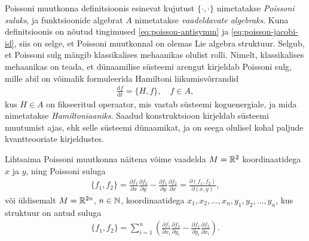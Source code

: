 Poissoni muutkonna definitsioonis esinevat kujutust $\{\cdot, \cdot\}$
nimetatakse \emph{Poissoni suluks}, ja funktsioonide algebrat $A$ nimetatakse
\emph{vaadeldavate algebraks}. Kuna definitsioonis on nõutud tingimused
\eqref{eq:poisson-antisymm} ja \eqref{eq:poisson-jacobi-id}, siis on selge,
et Poissoni muutkonnal on olemas Lie algebra struktuur.
Selgub, et Poissoni sulg mängib klassikalises mehaanikas olulist rolli.
Nimelt, klassikalises mehaanikas on teada, et dünaamilise süsteemi arengut
kirjeldab Poissoni sulg, mille abil on võimalik formuleerida Hamiltoni
liikumisvõrrandid
\begin{align}\label{eq:hamilton-equation}
    \frac{\mathrm{d} f}{\mathrm{d} t} = \{H, f\}, \quad f \in A,
\end{align}
kus $H \in A$ on fikseeritud operaator, mis vastab süsteemi koguenergiale,
ja mida nimetatakse \emph{Hamiltoniaaniks}. Saadud konstruktsioon
kirjeldab süsteemi muutumist ajas, ehk selle süsteemi dünaamikat, ja on
seega olulisel kohal paljude kvantteooriate kirjeldustes.

Lihtsaima Poissoni muutkonna näitena võime vaadelda $M = \mathbb{R}^2$
koordinaatidega $x$ ja $y$, ning Poissoni suluga
\begin{align*}
    \{f_1, f_2\} = \frac{\partial f_1}{\partial x} \frac{\partial f_2}{\partial y} -
        \frac{\partial f_1}{\partial y} \frac{\partial f_2}{\partial x} =
        \frac{\partial(f_1, f_2)}{\partial(x, y)},
\end{align*}
või üldisemalt $M = \mathbb{R}^{2n}$, $n \in \mathbb{N}$, koordinaatidega
$x_1, x_2, \dots, x_n, y_1, y_2, \dots, y_n$, kus struktuur on
antud suluga
\begin{align}\label{eq:R^n-poisson-sulg}
    \{f_1, f_2\} = \sum_{i=1}^{n} \left(
        \frac{\partial f_1}{\partial x_i} \frac{\partial f_2}{\partial y_i} -
        \frac{\partial f_1}{\partial y_i} \frac{\partial f_2}{\partial x_i}
    \right).
\end{align}

